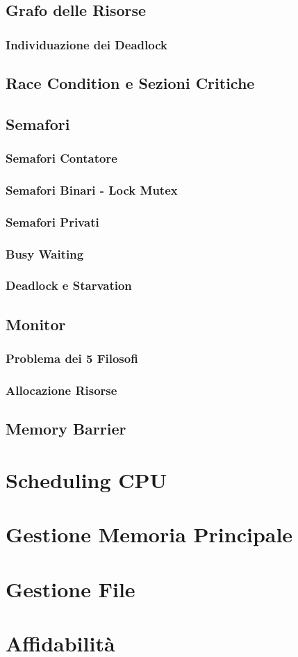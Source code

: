 \documentclass[a4paper]{article}
\begin{document}
\subsection{Grafo delle Risorse}
\subsubsection*{Individuazione dei Deadlock}
\subsection{Race Condition e Sezioni Critiche}
\subsection{Semafori}
\subsubsection*{Semafori Contatore}
\subsubsection*{Semafori Binari - Lock Mutex}
\subsubsection*{Semafori Privati}
\subsubsection*{Busy Waiting}
\subsubsection*{Deadlock e Starvation}
\subsection{Monitor}
\subsubsection*{Problema dei 5 Filosofi}
\subsubsection*{Allocazione Risorse}
\subsection{Memory Barrier}
\newpage
\section{Scheduling CPU}
\newpage
\section{Gestione Memoria Principale}
\newpage
\section{Gestione File}
\newpage
\section{Affidabilità}
\end{document}
